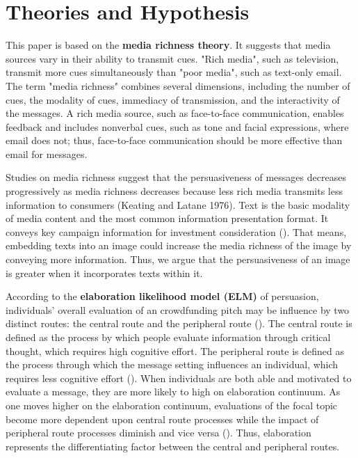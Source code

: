 \documentclass[a4paper]{article}
\begin{document}
\section{Theories and Hypothesis}
This paper is based on the \textbf{media richness theory}. It suggests that media sources vary in their ability to transmit cues. "Rich media", such as television, transmit more cues simultaneously than "poor media", such as text-only email. The term "media richness" combines several dimensions, including the number of cues, the modality of cues, immediacy of transmission, and the interactivity of the messages. A rich media source, such as face-to-face communication, enables feedback and includes nonverbal cues, such as tone and facial expressions, where email does not; thus, face-to-face communication should be more effective than email for messages. 

Studies on media richness suggest that the persuasiveness of messages decreases progressively as media richness decreases because less rich media transmits less information to consumers (Keating and Latane 1976).   Text is the basic modality of media content and the most common information presentation format. It conveys key campaign information for investment consideration (\cite{anglin_power_2018}). That means, embedding texts into an image could increase the media richness of the image by conveying more information. Thus, we argue that the persuasiveness of an image is greater when it incorporates texts within it.



According to the \textbf{elaboration likelihood model (ELM)} of persuasion, individuals' overall evaluation of an crowdfunding pitch may be influence by two distinct routes: the central route and the peripheral route (\cite{chaiken_communication_1983}). The central route is defined as the process by which people evaluate information through critical thought, which requires high cognitive effort. The peripheral route is defined as the process through which the message setting influences an individual, which requires less cognitive effort (\cite{petty_central_1983}).  When individuals are both able and motivated to evaluate a message, they are more likely to high on elaboration continuum. As one moves higher on the elaboration continuum, evaluations of the focal topic become more dependent upon central route processes while the impact of peripheral route processes diminish and vice versa (\cite{allison_persuasion_2017}). Thus, elaboration represents the differentiating factor between the central and peripheral routes. 
\end{document}
